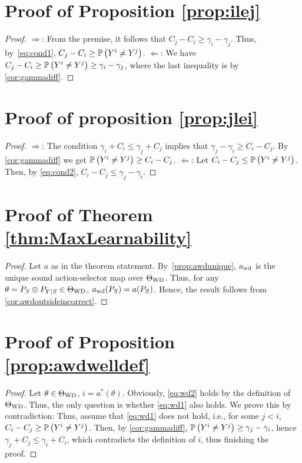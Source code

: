 \section*{Proof of Proposition \ref{prop:ilej}}
\begin{proof}
	\noindent $\Rightarrow$: From the premise, it follows that $C_j - C_i \ge \gamma_i - \gamma_j$.
	Thus, by~\eqref{eq:cond1}, $C_j - C_i \ge \mathbb{P}\left(Y^i\ne Y^j\right)$.
	\noindent $\Leftarrow$: We have $C_j - C_i \ge \mathbb{P}\left(Y^i \ne Y^j\right) \ge \gamma_i -\gamma_j$, where the last
	inequality is by \cref{cor:gammadiff}.
	\end{proof}
\section*{Proof of proposition \ref{prop:jlei}}	
	\begin{proof}
		\noindent $\Rightarrow$: The condition $\gamma_i + C_i \le \gamma_j + C_j$ implies that $\gamma_j -\gamma_i \ge C_i - C_j$.
		By \cref{cor:gammadiff} we get $\mathbb{P}\left(Y^i \ne Y^j\right) \ge C_i - C_j$.
		\noindent $\Leftarrow$: Let $C_i - C_j \le \mathbb{P}\left(Y^i \ne Y^j\right)$. Then, by \eqref{eq:cond2}, $C_i - C_j \le \gamma_j - \gamma_i$.
	\end{proof}

\section*{Proof of Theorem \ref{thm:MaxLearnability}}
\begin{proof}
	Let $a$ as in the theorem statement. By~\cref{prop:awdunique}, $a_{\mathrm{wd}}$ is the unique sound action-selector map over $\Theta_{\mathrm{WD}}$.
	Thus, for any $\theta = P_S\otimes P_{Y|S}\in \Theta_{\mathrm{WD}}$, $a_{\mathrm{wd}}(P_S) = a(P_S)$.
	Hence, the result follows from \cref{cor:awdoutsideincorrect}.
	\end{proof}
	


\section*{Proof of Proposition \ref{prop:awdwelldef}}
\begin{proof}
	Let $\theta\in \Theta_{\mathrm{WD}}$, $i = a^*(\theta)$. Obviously, \eqref{eq:wd2} holds by the definition of $\Theta_{\mathrm{WD}}$.
	Thus, the only question is whether \eqref{eq:wd1} also holds.
	We prove this by contradiction:
	Thus, assume that \eqref{eq:wd1} does not hold, i.e., for some $j<i$, $C_i-C_j \ge \mathbb{P}\left(Y^i \ne Y^j\right)$. Then, by \cref{cor:gammadiff}, $\mathbb{P}\left( Y^i \ne Y^j\right) \ge \gamma_j - \gamma_i$, hence $\gamma_j + C_j \le \gamma_i + C_i$, which contradicts the definition of $i$, thus finishing the proof.
	\end{proof}
